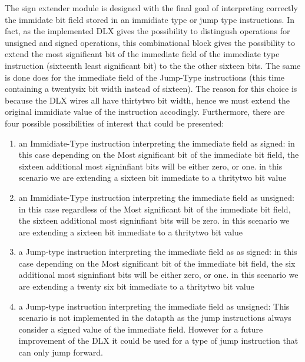     The sign extender module is designed with the final goal of interpreting correctly the immidate bit field stored in an immidiate type or jump type instructions.
    In fact, as the implemented DLX gives the possibility to distingush operations for unsigned and signed operations, this combinational block 
    gives the possibility to extend the most significant bit of the immediate field of the immediate type instruction (sixteenth least significant bit) to the the other sixteen bits. 
    The same is done does  for the immediate field of the Jump-Type instructions (this time containing a twentysix bit width instead of sixteen).
    The reason for this choice is because the DLX wires all have thirtytwo bit width, hence we must extend the original immidiate value of the instruction accodingly.
    Furthermore, there are four possible possibilities of interest that could be presented: 
    \begin{enumerate}

        \item an Immidiate-Type instruction interpreting the immediate field as signed: in this case depending on the Most significant bit of the immediate
        bit field, the sixteen additional most signinfiant bits will be either zero, or one. in this scenario we are extending a sixteen bit immediate to a thritytwo bit value
        
        \item an Immidiate-Type instruction interpreting the immediate field as unsigned: in this case regardless of the Most significant bit of the immediate
        bit field, the sixteen additional most signinfiant bits will be zero. in this scenario we are extending a sixteen bit immediate to a thritytwo bit value
     
        \item a Jump-type instruction interpreting the immediate field as as signed: in this case depending on the Most significant bit of the immediate
        bit field, the six additional most signinfiant bits will be either zero, or one. in this scenario we are extending a twenty six bit immediate to a thritytwo bit value

        \item a Jump-type instruction interpreting the immediate field as unsigned: This scenario is not implemented in the datapth as the jump instructions always consider
        a signed value of the immediate field. However for a future improvement of the DLX it could be used for a type of jump instruction that can only jump forward.

        \end{enumerate}

